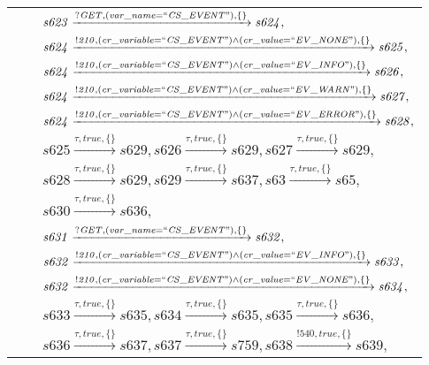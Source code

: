 \begin{tabular}{lcl}
& & $\mathit{s623}\xrightarrow{\mathit{?GET}, \mathit{(var\_name = ``CS\_EVENT")}, \{\}}\mathit{s624},$ \\
& & $\mathit{s624}\xrightarrow{\mathit{!210}, \mathit{(cr\_variable = ``CS\_EVENT") \land (cr\_value = ``EV\_NONE")}, \{\}}\mathit{s625},$ \\
& & $\mathit{s624}\xrightarrow{\mathit{!210}, \mathit{(cr\_variable = ``CS\_EVENT") \land (cr\_value = ``EV\_INFO")}, \{\}}\mathit{s626},$ \\
& & $\mathit{s624}\xrightarrow{\mathit{!210}, \mathit{(cr\_variable = ``CS\_EVENT") \land (cr\_value = ``EV\_WARN")}, \{\}}\mathit{s627},$ \\
& & $\mathit{s624}\xrightarrow{\mathit{!210}, \mathit{(cr\_variable = ``CS\_EVENT") \land (cr\_value = ``EV\_ERROR")}, \{\}}\mathit{s628},$ \\
& & $\mathit{s625}\xrightarrow{\mathit{\tau}, \mathit{true}, \{\}}\mathit{s629},\mathit{s626}\xrightarrow{\mathit{\tau}, \mathit{true}, \{\}}\mathit{s629},\mathit{s627}\xrightarrow{\mathit{\tau}, \mathit{true}, \{\}}\mathit{s629},$ \\
& & $\mathit{s628}\xrightarrow{\mathit{\tau}, \mathit{true}, \{\}}\mathit{s629},\mathit{s629}\xrightarrow{\mathit{\tau}, \mathit{true}, \{\}}\mathit{s637},\mathit{s63}\xrightarrow{\mathit{\tau}, \mathit{true}, \{\}}\mathit{s65},$ \\
& & $\mathit{s630}\xrightarrow{\mathit{\tau}, \mathit{true}, \{\}}\mathit{s636},$ \\
& & $\mathit{s631}\xrightarrow{\mathit{?GET}, \mathit{(var\_name = ``CS\_EVENT")}, \{\}}\mathit{s632},$ \\
& & $\mathit{s632}\xrightarrow{\mathit{!210}, \mathit{(cr\_variable = ``CS\_EVENT") \land (cr\_value = ``EV\_INFO")}, \{\}}\mathit{s633},$ \\
& & $\mathit{s632}\xrightarrow{\mathit{!210}, \mathit{(cr\_variable = ``CS\_EVENT") \land (cr\_value = ``EV\_NONE")}, \{\}}\mathit{s634},$ \\
& & $\mathit{s633}\xrightarrow{\mathit{\tau}, \mathit{true}, \{\}}\mathit{s635},\mathit{s634}\xrightarrow{\mathit{\tau}, \mathit{true}, \{\}}\mathit{s635},\mathit{s635}\xrightarrow{\mathit{\tau}, \mathit{true}, \{\}}\mathit{s636},$ \\
& & $\mathit{s636}\xrightarrow{\mathit{\tau}, \mathit{true}, \{\}}\mathit{s637},\mathit{s637}\xrightarrow{\mathit{\tau}, \mathit{true}, \{\}}\mathit{s759},\mathit{s638}\xrightarrow{\mathit{!540}, \mathit{true}, \{\}}\mathit{s639},$ \\

\end{tabular}
